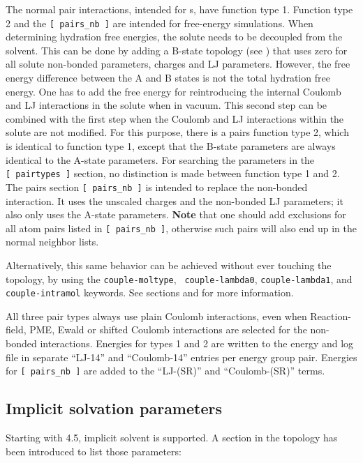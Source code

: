 The normal pair interactions, intended for s,
have function type 1. Function type 2 and the {\tt [~pairs_nb~]} are intended
for free-energy simulations. When determining hydration
free energies, the solute needs to be decoupled from the solvent.
This can be done by adding a B-state topology (see )
that uses zero for all solute non-bonded parameters, {\ie} charges and LJ parameters.
However, the free energy difference between the A and
B states is not the total hydration free energy.  One has to
add the free energy for reintroducing the internal Coulomb and 
LJ interactions in the solute when in vacuum. This second step can be combined with
the first step when the Coulomb and LJ interactions within
the solute are not modified. For this purpose, there is a pairs
function type 2, which is identical to function type 1, except
that the B-state parameters are always identical to the A-state
parameters. For searching the parameters in the {\tt [~pairtypes~]} section,
no distinction is made between function type 1 and 2.
The pairs section {\tt [~pairs_nb~]} is intended to replace the non-bonded interaction.
It uses the unscaled charges and the non-bonded LJ parameters;
it also only uses the A-state parameters. {\bf Note} that
one should add exclusions for all atom pairs listed in {\tt [~pairs_nb~]},
otherwise such pairs will also end up in the normal neighbor lists.

Alternatively, this same behavior can be achieved without ever
touching the topology, by using the {\tt couple-moltype}, {\tt
  couple-lambda0}, {\tt couple-lambda1}, and {\tt couple-intramol}
keywords.  See sections  and  for
more information.

All three pair types always use plain Coulomb interactions,
even when Reaction-field, PME, Ewald or shifted Coulomb interactions
are selected for the non-bonded interactions.
Energies for types 1 and 2 are written to the energy and log file
in separate ``LJ-14'' and ``Coulomb-14'' entries per energy group pair.
Energies for {\tt [~pairs_nb~]} are added to the ``LJ-(SR)'' and ``Coulomb-(SR)'' terms.

\subsection{Implicit solvation parameters}
Starting with {\gromacs} 4.5, implicit solvent is supported. A section in the
topology has been introduced to list those parameters:

